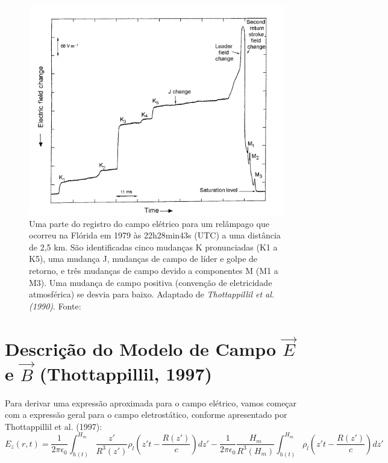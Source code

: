 \documentclass[a4paper, 12pt, onecolumn,singlespacing]{article}
\begin{document}
		\begin{figure}[!h]
			\centering
			\includegraphics[scale=1.9]{imagens/process_J_K_EFIELD.png}
			\caption{Uma parte do registro do campo elétrico para um relâmpago que ocorreu na Flórida em 1979 às 22h28min43s (UTC) a uma distância de 2,5 km. São identificadas cinco mudanças K pronunciadas (K1 a K5), uma mudança J, mudanças de campo de líder e golpe de retorno, e três mudanças de campo devido a componentes M (M1 a M3). Uma mudança de campo positiva (convenção de eletricidade atmosférica) se desvia para baixo. Adaptado de \textit{Thottappillil et al. (1990)}. Fonte: \cite{RAKOV_UHMAN}}
			\label{process_J_K_M}
		\end{figure}
		
	
	\section{Descrição do Modelo de Campo $\vec{E}$ e $\vec{B}$ (Thottappillil, 1997)}
	
	Para derivar uma expressão aproximada para o campo elétrico, vamos começar com a expressão geral para o campo eletrostático, conforme apresentado por Thottappillil et al. (1997):
	\begin{equation}
		E_z(r, t) = \frac{1}{2 \pi \epsilon_0} \int_{h(t)}^{H_m} \frac{z'}{R^3(z')} \rho_l \left(z't - \frac{R(z')}{c}\right) dz' - \frac{1}{2 \pi \epsilon_0} \frac{H_m}{R^3(H_m)} \int_{h(t)}^{H_m} \rho_l \left(z't - \frac{R(z')}{c}\right) dz'
		\label{eq_E_geral}
	\end{equation}
\end{document}
